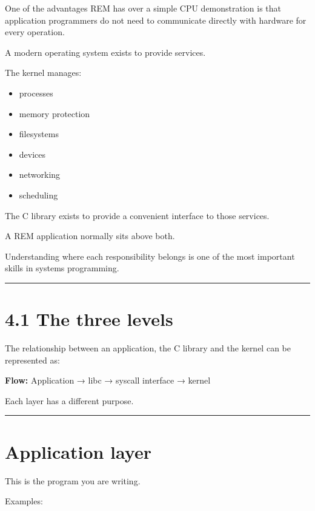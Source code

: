 \documentclass[
  oneside,
  openany]{book}
\providecommand{\tightlist}{%
  \setlength{\itemsep}{0pt}\setlength{\parskip}{0pt}}
\begin{document}
One of the advantages REM has over a simple CPU demonstration is that
application programmers do not need to communicate directly with
hardware for every operation.

A modern operating system exists to provide services.

The kernel manages:

\begin{itemize}
\tightlist
\item
  processes
\item
  memory protection
\item
  filesystems
\item
  devices
\item
  networking
\item
  scheduling
\end{itemize}

The C library exists to provide a convenient interface to those
services.

A REM application normally sits above both.

Understanding where each responsibility belongs is one of the most
important skills in systems programming.

\begin{center}\rule{0.5\linewidth}{0.5pt}\end{center}

\hypertarget{the-three-levels}{%
\section{4.1 The three levels}\label{the-three-levels}}

The relationship between an application, the C library and the kernel
can be represented as:

\textbf{Flow:} Application → libc → syscall interface → kernel

Each layer has a different purpose.

\begin{center}\rule{0.5\linewidth}{0.5pt}\end{center}

\hypertarget{application-layer}{%
\section{Application layer}\label{application-layer}}

This is the program you are writing.

Examples:
\end{document}
